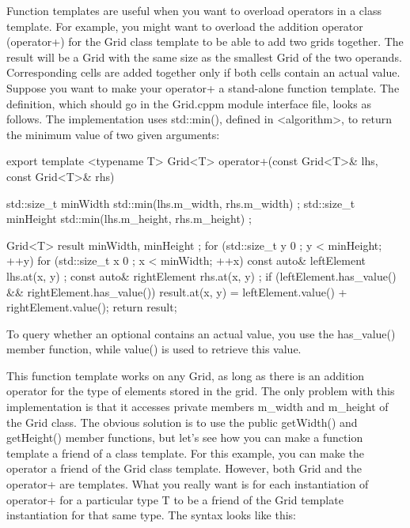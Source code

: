 
Function templates are useful when you want to overload operators in a class template. For example, you might want to overload the addition operator (operator+) for the Grid class template to be able to add two grids together. The result will be a Grid with the same size as the smallest Grid of the two operands. Corresponding cells are added together only if both cells contain an actual value. Suppose you want to make your operator+ a stand-alone function template. The definition, which should go in the Grid.cppm module interface file, looks as follows. The implementation uses std::min(), defined in <algorithm>, to return the minimum value of two given arguments:

\begin{cpp}
export template <typename T>
Grid<T> operator+(const Grid<T>& lhs, const Grid<T>& rhs)
{
    std::size_t minWidth { std::min(lhs.m_width, rhs.m_width) };
    std::size_t minHeight { std::min(lhs.m_height, rhs.m_height) };

    Grid<T> result { minWidth, minHeight };
    for (std::size_t y { 0 }; y < minHeight; ++y) {
        for (std::size_t x { 0 }; x < minWidth; ++x) {
            const auto& leftElement { lhs.at(x, y) };
            const auto& rightElement { rhs.at(x, y) };
            if (leftElement.has_value() && rightElement.has_value()) {
                result.at(x, y) = leftElement.value() + rightElement.value();
            }
        }
    }
    return result;
}
\end{cpp}

To query whether an optional contains an actual value, you use the has\_value() member function, while value() is used to retrieve this value.

This function template works on any Grid, as long as there is an addition operator for the type of elements stored in the grid. The only problem with this implementation is that it accesses private members m\_width and m\_height of the Grid class. The obvious solution is to use the public getWidth() and getHeight() member functions, but let’s see how you can make a function template a friend of a class template. For this example, you can make the operator a friend of the Grid class template. However, both Grid and the operator+ are templates. What you really want is for each instantiation of operator+ for a particular type T to be a friend of the Grid template instantiation for that same type. The syntax looks like this:


